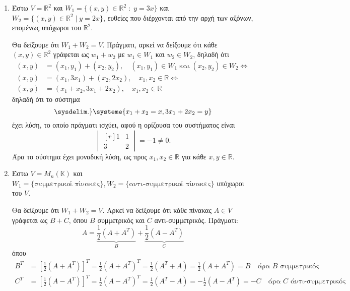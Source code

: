 \begin{examples}\label{ex:sums}
\item {}
  \begin{enumerate}
    \item \label{ex:r2} Έστω $ V = \mathbb{R}^{2} $ και $ W_{1} = 
      \{(x,y)\in \mathbb{R}^{2} \; : \; y =3x \} $ και 
      $ W_{2} = \{(x,y)\in \mathbb{R}^{2} \mid y=2x \} $, ευθείες που διέρχονται 
      από την αρχή των αξόνων, επομένως υπόχωροι του $ \mathbb{R}^{2}$. 

      Θα δείξουμε ότι $ W_{1}+W_{2} = V $. Πράγματι, αρκεί να δείξουμε ότι 
      κάθε $ (x,y) \in \mathbb{R}^{2} $ γράφεται ως $ w_{1}+w_{2} $ με 
      $ w_{1} \in W_{1} $ και $ w_{2} \in W_{2} $, δηλαδή ότι 
      \begin{align*}
        (x,y) &= (x_{1}, y_{1}) + (x_{2}, y_{2}), \quad (x_{1}, y_{1}) 
        \in W_{1} \; \text{και} \; (x_{2}, y_{2}) \in W_{2}
        \Leftrightarrow \\
        (x,y) &= (x_{1}, 3x_{1}) + (x_{2}, 2x_{2}), \quad x_{1}, x_{2} 
        \in \mathbb{R} \Leftrightarrow \\
        (x,y) &= (x_{1}+ x_{2}, 3x_{1}+ 2x_{2}), \quad x_{1}, x_{2} 
        \in \mathbb{R} 
      \end{align*}
      δηλαδή ότι το σύστημα 
      \[
      \sysdelim.\}\systeme{x_{1} + x_{2}=x,3x_{1} + 2x_{2}= y} 
    \] 
    έχει λύση, το οποίο πράγματι ισχύει, αφού η ορίζουσα του συστήματος είναι 
    \[
      \begin{vmatrix*}[r]
        1 & 1 \\
        3 & 2
      \end{vmatrix*} = -1 \neq 0.
    \]
    Άρα το σύστημα έχει μοναδική λύση, ως προς $ x_{1}, x_{2} \in \mathbb{R} $ 
    για κάθε $ x, y \in \mathbb{R} $.

  \item\label{ex:sym} Έστω $ V = M_{n}(\mathbb{K}) $ και $ W_{1} = 
    \{ \text{συμμετρικοί πίνακες} \}, W_{2} = 
    \{ \text{αντι-συμμετρικοί πίνακες} \} $ υπόχωροι του $V$.

    Θα δείξουμε ότι $ W_{1}+W_{2}=V $. Αρκεί να δείξουμε ότι κάθε πίνακας 
    $ A \in V $ γράφεται ως $ B+C $, όπου $ B $ συμμετρικός και $ C $ 
    αντι-συμμετρικός. Πράγματι:
    \[
      A = \underbrace{\frac{1}{2} (A+A^{T})}_{B} + 
      \underbrace{\frac{1}{2} (A-A^{T})}_{C} 
    \] 
    όπου
    \begin{align*}
      B^{T} &= \left[\frac{1}{2} (A+A^{T})\right]^{T} = 
      \frac{1}{2} (A+A^{T})^{T} = \frac{1}{2} (A^{T}+A) = 
      \frac{1}{2} (A+A^{T}) = B \quad \text{άρα $B$ συμμετρικός} \\
      C^{T} &= \left[\frac{1}{2} (A-A^{T})\right]^{T} = 
      \frac{1}{2} (A-A^{T})^{T} = \frac{1}{2} (A^{T}-A) = - 
      \frac{1}{2} (A-A^{T}) = -C \quad \text{άρα $C$ άντι-συμμετρικός}
    \end{align*}


\end{enumerate}
\end{examples}
